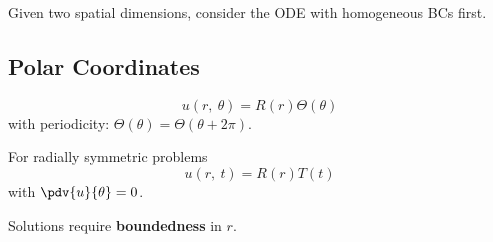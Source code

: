 \documentclass{article}
\begin{document}
\begin{multicols*}{3}
    Given two spatial dimensions, consider the ODE with
    homogeneous BCs first.
    \subsection{Polar Coordinates}
    \begin{equation*}
        u\left( r,\: \theta \right) = R\left( r \right) \Theta\left( \theta \right)
    \end{equation*}
    with periodicity:
    \(\Theta\left( \theta \right) = \Theta\left( \theta + 2 \pi \right)\).

    For radially symmetric problems
    \begin{equation*}
        u\left( r,\: t \right) = R\left( r \right) T\left( t \right)
    \end{equation*}
    with \(\pdv{u}{\theta} = 0\).

    Solutions require \textbf{boundedness} in \(r\).

\end{multicols*}
\end{document}

